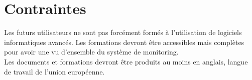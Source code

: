 \section{Contraintes}

Les futurs utilisateurs ne sont pas forcément formés à l'utilisation de 
logiciels informatiques avancés. Les formations devront être accessibles mais 
complètes pour avoir une vu d'ensemble du système de monitoring. \\

Les documents et formations devront être produits au moins en anglais, langue
de travail de l'union européenne. 

